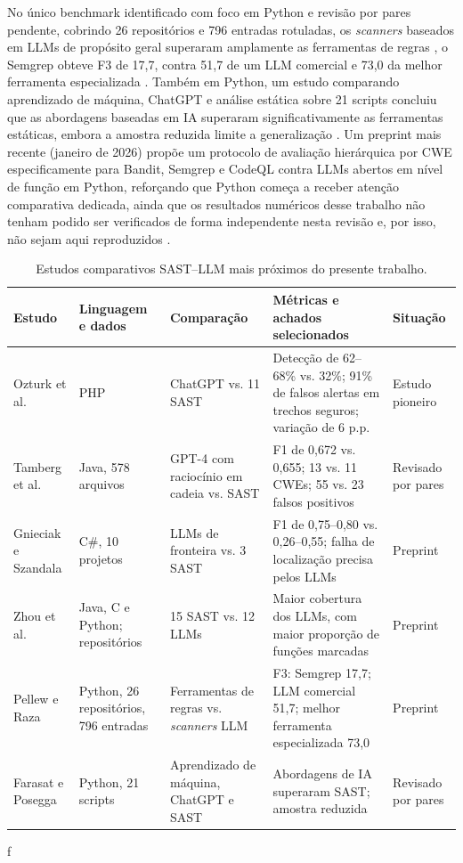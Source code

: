 No único benchmark identificado com foco em Python e revisão por pares pendente, cobrindo 26 repositórios e 796 entradas rotuladas, os \textit{scanners} baseados em LLMs de propósito geral superaram amplamente as ferramentas de regras , o Semgrep obteve F3 de 17,7, contra 51,7 de um LLM comercial e 73,0 da melhor ferramenta especializada \cite{Pellew2026RealVuln}. Também em Python, um estudo comparando aprendizado de máquina, ChatGPT e análise estática sobre 21 scripts concluiu que as abordagens baseadas em IA superaram significativamente as ferramentas estáticas, embora a amostra reduzida limite a generalização \cite{Farasat2025PythonSecurity}. Um preprint mais recente (janeiro de 2026) propõe um protocolo de avaliação hierárquica por CWE especificamente para Bandit, Semgrep e CodeQL contra LLMs abertos em nível de função em Python, reforçando que Python começa a receber atenção comparativa dedicada, ainda que os resultados numéricos desse trabalho não tenham podido ser verificados de forma independente nesta revisão e, por isso, não sejam aqui reproduzidos \cite{Adnan2026ALPHA}.


\begin{table}[htbp]
\centering
\caption{Estudos comparativos SAST–LLM mais próximos do presente trabalho.}\label{tab:compartivos-sast-llm}
\begin{tabularx}{\textwidth}{|X|X|X|X|X|}
\hline
\textbf{Estudo} & \textbf{Linguagem e dados} & \textbf{Comparação} & \textbf{Métricas e achados selecionados} & \textbf{Situação} \\
\hline
Ozturk et al. \cite{Ozturk2023AIvsSAST} & PHP & ChatGPT vs. 11 SAST & Detecção de 62–68\% vs. 32\%; 91\% de falsos alertas em trechos seguros; variação de 6 p.p. & Estudo pioneiro \\
\hline
Tamberg et al. \cite{Tamberg2025LLMHarness} & Java, 578 arquivos & GPT-4 com raciocínio em cadeia vs. SAST & F1 de 0,672 vs. 0,655; 13 vs. 11 CWEs; 55 vs. 23 falsos positivos & Revisado por pares \\
\hline
Gnieciak e Szandala \cite{Gnieciak2025LLMvsSAST} & C\#, 10 projetos & LLMs de fronteira vs. 3 SAST & F1 de 0,75–0,80 vs. 0,26–0,55; falha de localização precisa pelos LLMs & Preprint \\
\hline
Zhou et al. \cite{Zhou2024SASTLLMRepo} & Java, C e Python; repositórios & 15 SAST vs. 12 LLMs & Maior cobertura dos LLMs, com maior proporção de funções marcadas & Preprint \\
\hline
Pellew e Raza \cite{Pellew2026RealVuln} & Python, 26 repositórios, 796 entradas & Ferramentas de regras vs. \textit{scanners} LLM & F3: Semgrep 17,7; LLM comercial 51,7; melhor ferramenta especializada 73,0 & Preprint \\
\hline
Farasat e Posegga \cite{Farasat2025PythonSecurity} & Python, 21 scripts & Aprendizado de máquina, ChatGPT e SAST & Abordagens de IA superaram SAST; amostra reduzida & Revisado por pares \\
\hline
\end{tabularx}f
\end{table}

